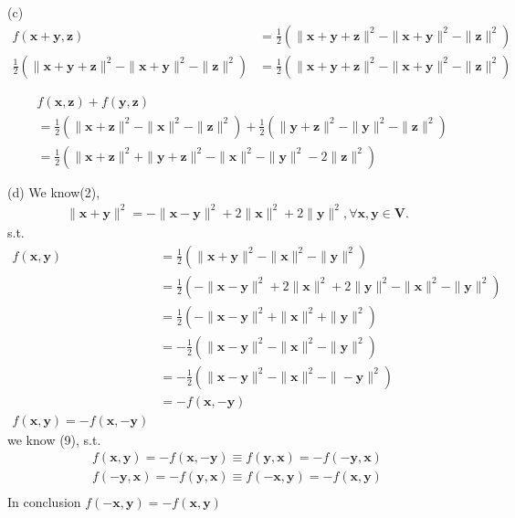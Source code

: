 \documentclass[a4paper,12pt]{article}
\begin{document}
(c)
\begin{align*}
    f(\bm{x} + \bm{y}, \bm{z}) &= \frac 1 2 (\|\bm{x} + \bm{y} + \bm{z}\|^2 - \|\bm{x} + \bm{y}\|^2 - \|\bm{z}\|^2) \\
    \frac 1 2 (\|\bm{x} + \bm{y} + \bm{z}\|^2 - \|\bm{x} + \bm{y}\|^2 - \|\bm{z}\|^2) &= \frac 1 2 (\|\bm{x} + \bm{y} + \bm{z}\|^2 - \|\bm{x} + \bm{y}\|^2 - \|\bm{z}\|^2) \\\\
\end{align*}
\begin{align*}
    & f(\bm{x}, \bm{z}) + f(\bm{y}, \bm{z}) \\
    &= \frac 1 2 (\|\bm{x} + \bm{z}\|^2 - \|\bm{x}\|^2 - \|\bm{z}\|^2) + \frac 1 2 (\|\bm{y} + \bm{z}\|^2 - \|\bm{y}\|^2 - \|\bm{z}\|^2) \\
    &=\frac 1 2 (\|\bm{x} + \bm{z}\|^2 + \|\bm{y} + \bm{z}\|^2 - \|\bm{x}\|^2 - \|\bm{y}\|^2 - 2\|\bm{z}\|^2) \\ \\
\end{align*}
(d)
We know(2),
\begin{align}
    \|\bm{x} + \bm{y}\|^2 = - \|\bm{x} - \bm{y}\|^2 + 2\|\bm{x}\|^2 + 2\|\bm{y}\|^2, \forall \bm{x}, \bm{y} \in \bm{V}.
\end{align}
s.t.
\begin{align*}
    f(\bm{x}, \bm{y}) &= \frac 1 2 (\|\bm{x} + \bm{y}\|^2 - \|\bm{x}\|^2 - \|\bm{y}\|^2) \\
    &= \frac 1 2 (- \|\bm{x} - \bm{y}\|^2 + 2\|\bm{x}\|^2 + 2\|\bm{y}\|^2 - \|\bm{x}\|^2 - \|\bm{y}\|^2 )  \\
    &= \frac 1 2 (- \|\bm{x} - \bm{y}\|^2 + \|\bm{x}\|^2 + \|\bm{y}\|^2)  \\
    &= -\frac 1 2 (\|\bm{x} - \bm{y}\|^2 - \|\bm{x}\|^2 - \|\bm{y}\|^2)  \\
    &= -\frac 1 2 (\|\bm{x} - \bm{y}\|^2 - \|\bm{x}\|^2 - \|-\bm{y}\|^2)  \\
    &= -f(\bm{x}, -\bm{y}) \\
    f(\bm{x}, \bm{y}) = -f(\bm{x}, -\bm{y})
\end{align*}
we know (9), s.t.
\begin{align*}
    f(\bm{x}, \bm{y}) = -f(\bm{x}, -\bm{y}) \equiv f(\bm{y}, \bm{x}) = -f(-\bm{y}, \bm{x})\\
    f(-\bm{y}, \bm{x}) = -f(\bm{y}, \bm{x}) \equiv f(-\bm{x}, \bm{y}) = -f(\bm{x}, \bm{y}) \\
\end{align*}
In conclusion \(f(-\bm{x}, \bm{y}) = -f(\bm{x}, \bm{y})\)
\end{document}
